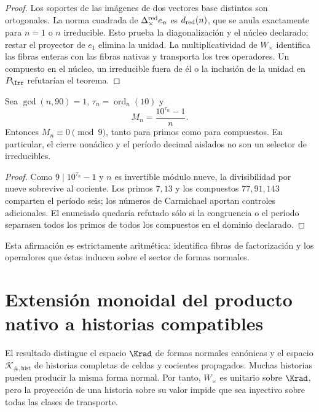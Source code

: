 \begin{proof}
Los soportes de las imágenes de dos vectores base distintos son ortogonales.
La norma cuadrada de
\(\Delta_\times^{\rm red}e_n\) es \(d_{\rm red}(n)\), que se anula
exactamente para \(n=1\) o \(n\) irreducible. Esto prueba la diagonalización
y el núcleo declarado; restar el proyector de \(e_1\) elimina la unidad.
La multiplicatividad de \(W_\times\) identifica las fibras enteras con las
fibras nativas y transporta los tres operadores. Un compuesto en el núcleo,
un irreducible fuera de él o la inclusión de la unidad en \(P_{\Irr}\)
refutarían el teorema.
\end{proof}

\begin{proposition}
\label{int:pf84:B05}
Sea \(\gcd(n,90)=1\),
\(\tau_n=\operatorname{ord}_n(10)\) y
\[
 M_n=\frac{10^{\tau_n}-1}{n}.
\]
Entonces \(M_n\equiv0\pmod9\), tanto para primos como para compuestos. En
particular, el cierre nonádico y el período decimal aislados no son un
selector de irreducibles.
\end{proposition}

\begin{proof}
Como \(9\mid10^{\tau_n}-1\) y \(n\) es invertible módulo nueve, la
divisibilidad por nueve sobrevive al cociente. Los primos \(7,13\) y los
compuestos \(77,91,143\) comparten el período seis; los números de Carmichael
aportan controles adicionales. El enunciado quedaría refutado sólo si la
congruencia o el período separasen todos los primos de todos los compuestos
en el dominio declarado.
\end{proof}

Esta afirmación es estrictamente aritmética: identifica fibras de
factorización y los operadores que éstas inducen sobre el sector de formas
normales.

\ifdefined\HMTInternalTraceability
\section{Extensión monoidal del producto nativo a historias compatibles}
\label{int:pf84:SYN-05D-HIST}

El resultado distingue el espacio \(\Krad\) de formas normales canónicas y
el espacio \(\mathcal K_{\#,\mathrm{hist}}\) de historias completas de
celdas y cocientes propagados.
Muchas historias pueden producir la misma forma normal. Por tanto,
$W_\times$ es unitario sobre $\Krad$, pero la proyección de una historia sobre
su valor impide que sea inyectivo sobre todas las clases de transporte.

